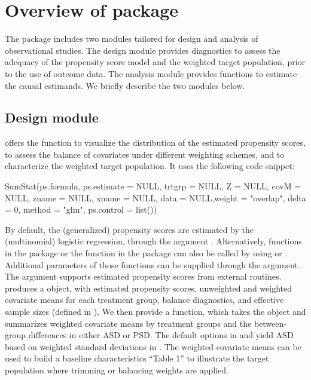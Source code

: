  

\section{Overview of package} \label{sec:overview}
The  package includes two modules tailored for design and analysis of observational studies. The design module provides diagnostics to assess the adequacy of the propensity score model and the weighted target population, prior to the use of outcome data. The analysis module provides functions to estimate the causal estimands. 
We briefly describe the two modules below.

\subsection{Design module}


 offers the  function to visualize the distribution of the estimated propensity scores, to assess the balance of covariates under different weighting schemes, and to characterize the weighted target population. It uses the following code snippet:

\begin{example}
SumStat(ps.formula, ps.estimate = NULL, trtgrp = NULL, Z = NULL, covM = NULL, 
    zname = NULL,  xname = NULL, data = NULL,weight = "overlap", delta = 0,
    method = "glm", ps.control = list())
\end{example}


By default, the (generalized) propensity scores are estimated by the (multinomial) logistic regression, through the argument . Alternatively,  functions in the  package \citep{gbmpkg} or the  function in the  package \citep{slpkg} can also be called by using  or . Additional parameters of those functions can be supplied through the  argument. The argument  supports estimated propensity scores from external routines.  produces a  object, with estimated propensity scores, unweighted and weighted covariate means for each treatment group, balance diagnostics, and effective sample sizes (defined in \citep{li2019propensity}). We then provide a  function, which takes the  object and summarizes weighted covariate means by treatment groups and the between-group differences in either ASD or PSD. The default options in  and  yield ASD based on weighted standard deviations in \cite{austin2015moving}. The weighted covariate means can be used to build a baseline characteristics ``Table 1'' to illustrate the target population where trimming or balancing weights are applied. 


